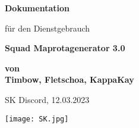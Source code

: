 \begin{titlepage}


    \begin{center}
    \end{center}

    \begin{center}
        \vspace*{1cm}
        \Large
        \textbf{Dokumentation}

        \vspace*{0.5cm}
        \normalsize
        für den Dienstgebrauch

        \vspace*{1cm}
        \huge
        \textbf{Squad Maprotagenerator 3.0}\\
        \vspace{0.5cm}
        

        \vspace{1.5cm}
        \Large
        \textbf{von}\\
        \textbf{Timbow, Fletschoa, KappaKay}

        \vspace{0.5cm}
        \normalsize

        \vspace{1.5cm}
        SK Discord, 12.03.2023

        \vspace{3.3cm}

        \texttt{[image: SK.jpg]}
    
    \end{center}
\end{titlepage}